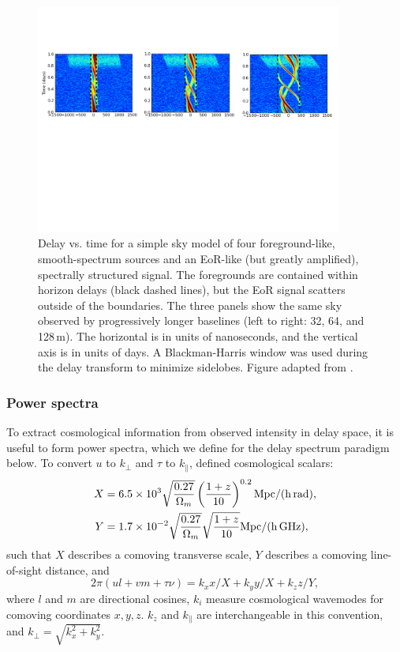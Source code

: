 \begin{figure}
\centering
\includegraphics[width=0.9\textwidth]{chapters/eor_window_theory/figures/parsonsAdapt.pdf}
\caption[Delay vs. time for a simple sky model of four foreground-like, smooth-spectrum sources and an EoR-like (but greatly amplified), spectrally structured signal.]{Delay vs. time for a simple sky model of four foreground-like, smooth-spectrum sources and an EoR-like (but greatly amplified), spectrally structured signal. The foregrounds are contained within horizon delays (black dashed lines), but the EoR signal scatters outside of the boundaries. The three panels show the same sky observed by progressively longer baselines (left to right: 32, 64, and 128\,m). The horizontal is in units of nanoseconds, and the vertical axis is in units of days. A Blackman-Harris window was used during the delay transform to minimize sidelobes. Figure adapted from \cite{Parsons.12a}.}
\label{fig:eor_window_parsons_adapt}
\end{figure}

\subsubsection{Power spectra}

To extract cosmological information from observed intensity in delay space, it is useful to form power spectra, which we define for the delay spectrum paradigm below. To convert $u$ to $k_{\perp}$ and $\tau$ to $k_{\parallel}$, \cite{Parsons.12b} defined cosmological scalars:
\begin{align}
X &= 6.5 \times 10^3 \sqrt{\frac{0.27}{\Omega_m}}\left(\frac{1+z}{10}\right)^{0.2} {\rm Mpc/(h\,rad)}, \\
Y &= 1.7 \times 10^{-2} \sqrt{\frac{0.27}{\Omega_m}} \sqrt{\frac{1+z}{10}} {\rm Mpc/(h\,GHz)},
\end{align}
such that $X$ describes a comoving transverse scale, $Y$ describes a comoving line-of-sight distance, and
\begin{equation}
2\pi(ul + vm + \tau\nu) = k_x x /X + k_y y/ X + k_z z/Y,
\end{equation}
where $l$ and $m$ are directional cosines, $k_i$ measure cosmological wavemodes for comoving coordinates $x,y,z$. $k_z$ and $k_{\parallel}$ are interchangeable in this convention, and $k_{\perp} = \sqrt{k_x^2 + k_y^2}$.


